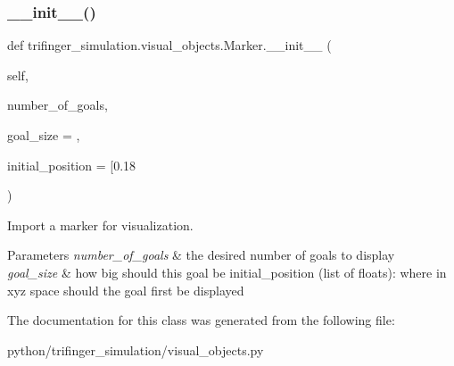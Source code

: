 \subsubsection{\texorpdfstring{\+\_\+\+\_\+init\+\_\+\+\_\+()}{\_\_init\_\_()}}
{\footnotesize\ttfamily def trifinger\+\_\+simulation.\+visual\+\_\+objects.\+Marker.\+\_\+\+\_\+init\+\_\+\+\_\+ (\begin{DoxyParamCaption}\item[{}]{self,  }\item[{}]{number\+\_\+of\+\_\+goals,  }\item[{}]{goal\+\_\+size = {},  }\item[{}]{initial\+\_\+position = {\ttfamily \mbox{[}0.18} }\end{DoxyParamCaption})}



Import a marker for visualization. 


\begin{DoxyParams}{Parameters}
{\em number\+\_\+of\+\_\+goals} & the desired number of goals to display \\
\hline
{\em goal\+\_\+size} & how big should this goal be initial\+\_\+position (list of floats)\+: where in xyz space should the goal first be displayed \\
\hline
\end{DoxyParams}


The documentation for this class was generated from the following file\+:\begin{DoxyCompactItemize}
\item 
python/trifinger\+\_\+simulation/visual\+\_\+objects.\+py\end{DoxyCompactItemize}
